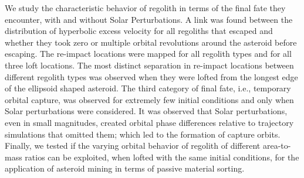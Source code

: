 We study the characteristic behavior of regolith in terms of the final fate they encounter, with and without Solar Perturbations. A link was found between the distribution of hyperbolic excess velocity for all regoliths that escaped and whether they took zero or multiple orbital revolutions around the asteroid before escaping. The re-impact locations were mapped for all regolith types and for all three loft locations. The most distinct separation in re-impact locations between different regolith types was observed when they were lofted from the longest edge of the ellipsoid shaped asteroid. The third category of final fate, i.e., temporary orbital capture, was observed for extremely few initial conditions and only when Solar perturbations were considered. It was observed that Solar perturbations, even in small magnitudes, created orbital phase differences relative to trajectory simulations that omitted them; which led to the formation of capture orbits. Finally, we tested if the varying orbital behavior of regolith of different area-to-mass ratios can be exploited, when lofted with the same initial conditions, for the application of asteroid mining in terms of passive material sorting.



